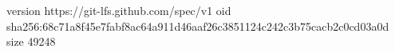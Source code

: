 version https://git-lfs.github.com/spec/v1
oid sha256:68c71a8f45e7fabf8ac64a911d46aaf26c3851124c242c3b75cacb2c0cd03a0d
size 49248

